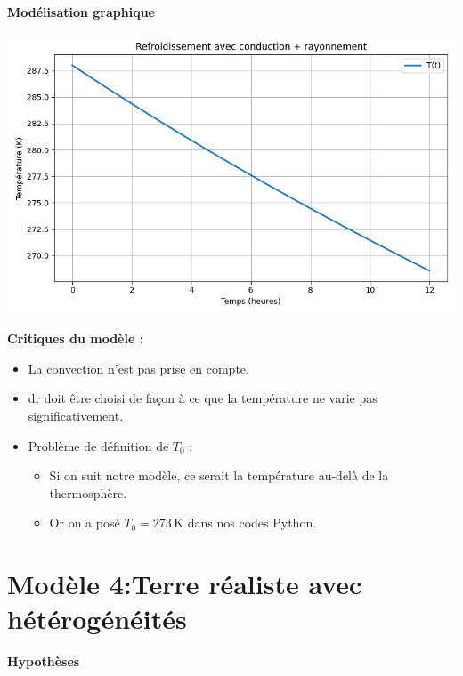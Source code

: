 \documentclass[a4paper,12pt]{article}
\begin{document}
\vspace{1cm}
\textbf{Modélisation graphique}
    
    \includegraphics[width=0.8\linewidth]{../modele3/figures/modele3_coquille-conduction-rayonnement.png}    

\vspace{1cm}
\textbf{Critiques du modèle :}
\begin{itemize}
    \item La convection n’est pas prise en compte.
    \item dr doit être choisi de façon à ce que la température ne varie pas significativement.
    \item Problème de définition de $T_0$ :
    \begin{itemize}
        \item Si on suit notre modèle, ce serait la température au-delà de la thermosphère.
        \item Or on a posé $T_0 = 273\, \mathrm{K}$ dans nos codes Python. 
    
    \end{itemize}
\end{itemize}
\section{Modèle 4:Terre réaliste avec hétérogénéités }
\textbf{Hypothèses}
\end{document}

